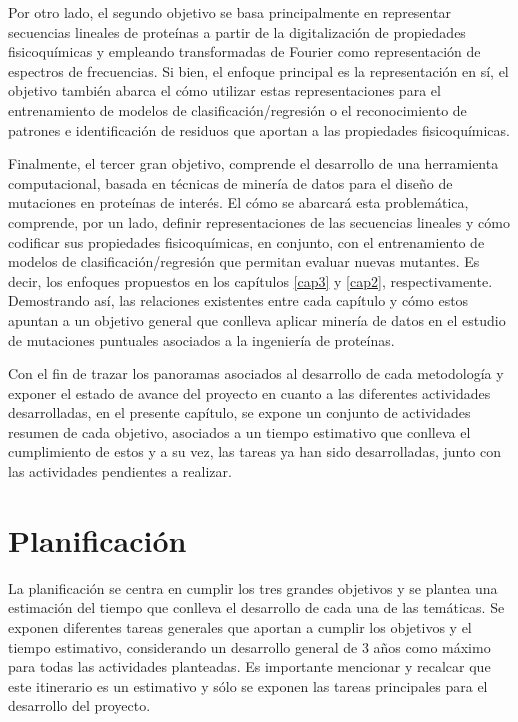 Por otro lado, el segundo objetivo se basa principalmente en representar secuencias lineales de proteínas a partir de la digitalización de propiedades fisicoquímicas y empleando transformadas de Fourier como representación de espectros de frecuencias. Si bien, el enfoque principal es la representación en sí, el objetivo también abarca el cómo utilizar estas representaciones para el entrenamiento de modelos de clasificación/regresión o el reconocimiento de patrones e identificación de residuos que aportan a las propiedades fisicoquímicas.

Finalmente, el tercer gran objetivo, comprende el desarrollo de una herramienta computacional, basada en técnicas de minería de datos para el diseño de mutaciones en proteínas de interés. El cómo se abarcará esta problemática, comprende, por un lado, definir representaciones de las secuencias lineales y cómo codificar sus propiedades fisicoquímicas, en conjunto, con el entrenamiento de modelos de clasificación/regresión que permitan evaluar nuevas mutantes. Es decir, los enfoques propuestos en los capítulos \ref{cap3} y \ref{cap2}, respectivamente. Demostrando así, las relaciones existentes entre cada capítulo y cómo estos apuntan a un objetivo general que conlleva aplicar minería de datos en el estudio de mutaciones puntuales asociados a la ingeniería de proteínas.

Con el fin de trazar los panoramas asociados al desarrollo de cada metodología y exponer el estado de avance del proyecto en cuanto a las diferentes actividades desarrolladas, en el presente capítulo, se expone un conjunto de actividades resumen de cada objetivo, asociados a un tiempo estimativo que conlleva el cumplimiento de estos y a su vez, las tareas ya han sido desarrolladas, junto con las actividades pendientes a realizar.

\section{Planificación}

La planificación se centra en cumplir los tres grandes objetivos y se plantea una estimación del tiempo que conlleva el desarrollo de cada una de las temáticas. Se exponen diferentes tareas generales que aportan a cumplir los objetivos y el tiempo estimativo, considerando un desarrollo general de 3 años como máximo para todas las actividades planteadas. Es importante mencionar y recalcar que este itinerario es un estimativo y sólo se exponen las tareas principales para el desarrollo del proyecto.

